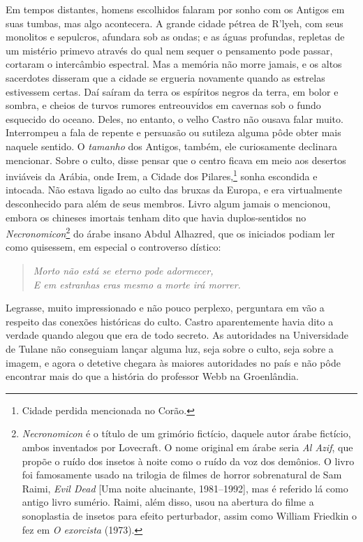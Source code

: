 Em tempos distantes, homens escolhidos falaram por sonho com os Antigos
em suas tumbas, mas algo acontecera. A grande cidade pétrea de R'lyeh,
com seus monolitos e sepulcros, afundara sob as ondas; e as águas
profundas, repletas de um mistério primevo através do qual nem sequer o
pensamento pode passar, cortaram o intercâmbio espectral. Mas a memória
não morre jamais, e os altos sacerdotes disseram que a cidade se
ergueria novamente quando as estrelas estivessem certas. Daí saíram da
terra os espíritos negros da terra, em bolor e sombra, e cheios de
turvos rumores entreouvidos em cavernas sob o fundo esquecido do oceano.
Deles, no entanto, o velho Castro não ousava falar muito. Interrompeu a fala
de repente e persuasão ou sutileza alguma pôde obter mais naquele
sentido. O \emph{tamanho} dos Antigos, também, ele curiosamente
declinara mencionar. Sobre o culto, disse pensar que o centro ficava em
meio aos desertos inviáveis da Arábia, onde Irem, a Cidade dos
Pilares,\footnote{Cidade perdida mencionada no Corão.} sonha escondida e
intocada. Não estava ligado ao culto das bruxas da Europa, e era
virtualmente desconhecido para além de seus membros. Livro algum jamais
o mencionou, embora os chineses imortais tenham dito que havia
duplos-sentidos no \emph{Necronomicon}\footnote{\emph{Necronomicon} é o
  título de um grimório fictício, daquele autor árabe fictício, ambos
  inventados por Lovecraft. O nome original em árabe seria \emph{Al
  Azif}, que propõe o ruído dos insetos à noite como o ruído da
  voz dos demônios. O livro foi famosamente usado na trilogia de
  filmes de horror sobrenatural de Sam Raimi, \emph{Evil Dead}
  [Uma noite alucinante, 1981--1992], mas é referido lá como antigo livro sumério. Raimi, além
  disso, usou na abertura do filme a sonoplastia de insetos para efeito
  perturbador, assim como William Friedkin o fez em \emph{O exorcista} (1973).} do árabe insano Abdul Alhazred, que os iniciados podiam ler
como quisessem, em especial o controverso dístico:

\begin{verse}
\emph{Morto não está se eterno pode adormecer,\\
E em estranhas eras mesmo a morte irá morrer.}
\end{verse}

Legrasse, muito impressionado e não pouco perplexo, perguntara em vão a
respeito das conexões históricas do culto. Castro aparentemente havia
dito a verdade quando alegou que era de todo secreto. As autoridades na
Universidade de Tulane não conseguiam lançar alguma luz, seja sobre o
culto, seja sobre a imagem, e agora o detetive chegara às maiores
autoridades no país e não pôde encontrar mais do que a história do
professor Webb na Groenlândia.

